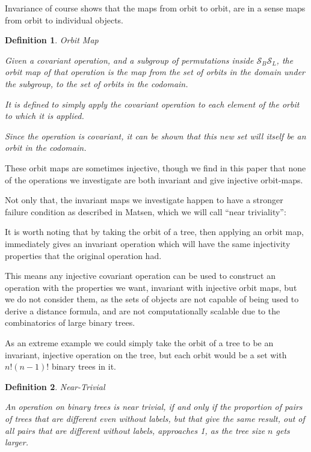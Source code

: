\documentclass[10pt,a4paper]{report}
\newcommand{\S}{\mathcal{S}}
\newtheorem{definition}{Definition}
\begin{document}
Invariance of course shows that the maps from orbit to orbit, are in a sense
maps from orbit to individual objects.

\begin{definition} Orbit Map

	Given a covariant operation, and a subgroup of permutations inside
	$\S_B\S_L$, the orbit map of that operation is the map from the set
	of orbits in the domain under the subgroup, to the set of orbits in the
	codomain.

	It is defined to simply apply the covariant operation to each element of
	the orbit to which it is applied.

	Since the operation is covariant, it can be shown that this new set will
	itself be an orbit in the codomain.
\end{definition}

These orbit maps are sometimes injective, though we find in this paper that
none of the operations we investigate are both invariant and give injective
orbit-maps.

Not only that, the invariant maps we investigate happen to have a stronger
failure condition as described in Matsen, which we will call ``near
triviality'':


It is worth noting that by taking the orbit of a tree, then applying an orbit map, immediately gives an invariant operation which will have the same injectivity properties that the original operation had.

This means any injective covariant operation can be used to construct an operation with the properties we want, invariant with injective orbit maps, but we do not consider them, as the sets of objects are not capable of being used to derive a distance formula, and are not computationally scalable due to the combinatorics of large binary trees.

As an extreme example we could simply take the orbit of a tree to be an invariant, injective operation on the tree, but each orbit would be a set with $n!(n-1)!$ binary trees in it.

\begin{definition} Near-Trivial

	An operation on binary trees is near trivial, if and only if the proportion
	of pairs of trees that are different even without labels, but that give the same result,
	out of all pairs that are different without labels, approaches 1, as the tree
	size $n$ gets larger.
\end{definition}
\end{document}
